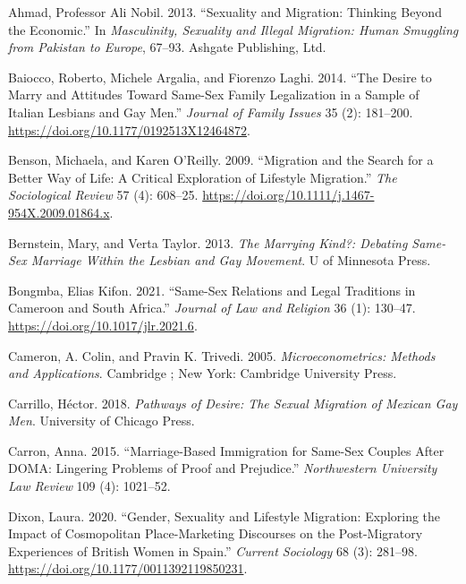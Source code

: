 \documentclass[
  12pt,
]{article}
\newlength{\cslhangindent}
\newlength{\cslentryspacingunit} %
\newenvironment{CSLReferences}[2] %
 {%
  \setlength{\parindent}{0pt}
  \ifodd #1
  \let\oldpar\par
  \def\par{\hangindent=\cslhangindent\oldpar}
  \fi
  \setlength{\parskip}{#2\cslentryspacingunit}
 }%
 {}
\begin{document}
\hypertarget{refs}{}
\begin{CSLReferences}{1}{0}
\leavevmode{}%
Ahmad, Professor Ali Nobil. 2013. {``Sexuality and {Migration}: {Thinking} Beyond the {Economic}.''} In \emph{Masculinity, {Sexuality} and {Illegal Migration}: {Human Smuggling} from {Pakistan} to {Europe}}, 67--93. {Ashgate Publishing, Ltd.}

\leavevmode{}%
Baiocco, Roberto, Michele Argalia, and Fiorenzo Laghi. 2014. {``The {Desire} to {Marry} and {Attitudes Toward Same-Sex Family Legalization} in a {Sample} of {Italian Lesbians} and {Gay Men}.''} \emph{Journal of Family Issues} 35 (2): 181--200. \url{https://doi.org/10.1177/0192513X12464872}.

\leavevmode{}%
Benson, Michaela, and Karen O'Reilly. 2009. {``Migration and the {Search} for a {Better Way} of {Life}: {A Critical Exploration} of {Lifestyle Migration}.''} \emph{The Sociological Review} 57 (4): 608--25. \url{https://doi.org/10.1111/j.1467-954X.2009.01864.x}.

\leavevmode{}%
Bernstein, Mary, and Verta Taylor. 2013. \emph{The {Marrying Kind}?: {Debating Same-Sex Marriage} Within the {Lesbian} and {Gay Movement}}. {U of Minnesota Press}.

\leavevmode{}%
Bongmba, Elias Kifon. 2021. {``Same-{Sex Relations} and {Legal Traditions} in {Cameroon} and {South Africa}.''} \emph{Journal of Law and Religion} 36 (1): 130--47. \url{https://doi.org/10.1017/jlr.2021.6}.

\leavevmode{}%
Cameron, A. Colin, and Pravin K. Trivedi. 2005. \emph{Microeconometrics: {Methods} and {Applications}}. {Cambridge ; New York}: {Cambridge University Press}.

\leavevmode{}%
Carrillo, Héctor. 2018. \emph{Pathways of {Desire}: {The Sexual Migration} of {Mexican Gay Men}}. {University of Chicago Press}.

\leavevmode{}%
Carron, Anna. 2015. {``Marriage-{Based Immigration} for {Same-Sex Couples After DOMA}: {Lingering Problems} of {Proof} and {Prejudice}.''} \emph{Northwestern University Law Review} 109 (4): 1021--52.

\leavevmode{}%
Dixon, Laura. 2020. {``Gender, Sexuality and Lifestyle Migration: {Exploring} the Impact of Cosmopolitan Place-Marketing Discourses on the Post-Migratory Experiences of {British} Women in {Spain}.''} \emph{Current Sociology} 68 (3): 281--98. \url{https://doi.org/10.1177/0011392119850231}.


\end{CSLReferences}
\end{document}
